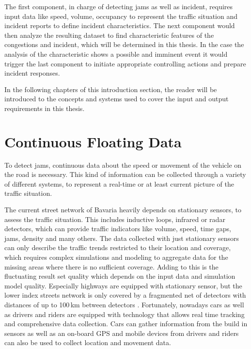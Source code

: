 \documentclass[a4paper,12pt]{report}
\begin{document}
The first component, in charge of detecting \glspl{jam} as well as incident, requires input data like speed, volume, occupancy to represent the traffic situation and incident reports to define incident characteristics. The next component would then analyze the resulting dataset to find characteristic features of the congestions and incident, which will be determined in this thesis. In the case the analysis of the characteristic shows a possible and imminent event it would trigger the last component to initiate appropriate controlling actions and prepare incident responses.

In the following chapters of this introduction section, the reader will be introduced to the concepts and systems used to cover the input and output requirements in this thesis.

\section{Continuous Floating Data}

To detect \glspl{jam}, continuous data about the speed or movement of the vehicle on the road is necessary. This kind of information can be collected through a variety of different systems, to represent a real-time or at least current picture of the traffic situation. 

The current street network of Bavaria heavily depends on stationary sensors, to assess the traffic situation. This includes inductive loops, infrared or radar detectors, which can provide traffic indicators like volume, speed, time gaps, jams, density and many others. The data collected with just stationary sensors can only describe the traffic trends restricted to their location and coverage, which requires complex simulations and modeling to aggregate data for the missing areas where there is no sufficient coverage. Adding to this is the fluctuating result set quality which depends on the input data and simulation model quality. Especially highways are equipped with stationary sensor, but the lower index streets network is only covered by a fragmented net of detectors with distances of up to 100\,km between detectors \cite{INDRIX2015}. Fortunately, nowadays cars as well as drivers and riders are equipped with technology that allows real time tracking and comprehensive data collection. Cars can gather information from the build in sensors as well as an on-board GPS and mobile devices from drivers and riders can also be used to collect location and movement data. \cite{Randelhoff2016}
\end{document}

